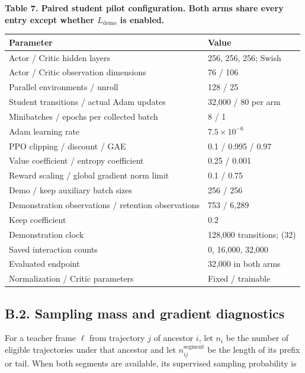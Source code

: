 \documentclass[
  american,
  11pt,
  a4paper,
]{article}
\newcounter{none} %
\begin{document}
\par\medskip
\noindent\begin{minipage}{\linewidth}
\textbf{Table 7. Paired student pilot configuration. Both arms share
every entry except whether \(L_{\mathrm{demo}}\) is enabled.}

{\def\LTcaptype{none} %
\begin{tabular}{@{}ll@{}}
\toprule\noalign{}
Parameter & Value \\
\midrule\noalign{}
Actor / Critic hidden layers & 256, 256, 256; Swish \\
Actor / Critic observation dimensions & 76 / 106 \\
Parallel environments / unroll & 128 / 25 \\
Student transitions / actual Adam updates & 32,000 / 80 per arm \\
Minibatches / epochs per collected batch & 8 / 1 \\
Adam learning rate & \(7.5\times10^{-6}\) \\
PPO clipping / discount / GAE & 0.1 / 0.995 / 0.97 \\
Value coefficient / entropy coefficient & 0.25 / 0.001 \\
Reward scaling / global gradient norm limit & 0.1 / 0.75 \\
Demo / keep auxiliary batch sizes & 256 / 256 \\
Demonstration observations / retention observations & 753 / 6,289 \\
Keep coefficient & 0.2 \\
Demonstration clock & 128,000 transitions; (32) \\
Saved interaction counts & 0, 16,000, 32,000 \\
Evaluated endpoint & 32,000 in both arms \\
Normalization / Critic parameters & Fixed / trainable \\
\bottomrule
\end{tabular}
}
\end{minipage}
\par\medskip

\subsection{B.2. Sampling mass and gradient
diagnostics}\label{b.2.-sampling-mass-and-gradient-diagnostics}

For a teacher frame \(\ell\) from trajectory \(j\) of ancestor \(i\),
let \(n_i\) be the number of eligible trajectories under that ancestor
and let \(n_{ij}^{\mathrm{segment}}\) be the length of its prefix or
tail. When both segments are available, its supervised sampling
probability is
\end{document}
